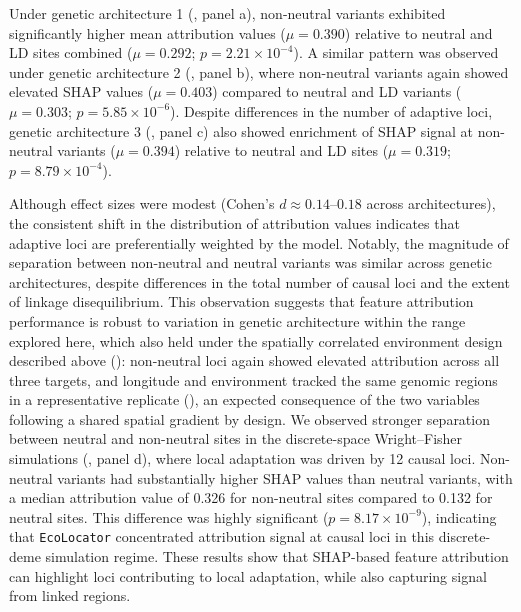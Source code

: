 \documentclass[]{article}
\newcommand{\ecolocator}{\texttt{EcoLocator}\xspace}
\begin{document}
Under genetic architecture 1
(, panel a),
non-neutral variants exhibited significantly higher mean attribution values
($\mu = 0.390$) relative to neutral and LD sites combined
($\mu = 0.292$; $p = 2.21 \times 10^{-4}$).
A similar pattern was observed under genetic architecture 2
(, panel b),
where non-neutral variants again showed elevated SHAP values
($\mu = 0.403$)
compared to neutral and LD variants
($\mu = 0.303$; $p = 5.85 \times 10^{-6}$).
Despite differences in the number of adaptive loci,
genetic architecture 3
(, panel c)
also showed enrichment of SHAP signal at non-neutral variants
($\mu = 0.394$)
relative to neutral and LD sites
($\mu = 0.319$; $p = 8.79 \times 10^{-4}$).

Although effect sizes were modest
(Cohen's $d \approx 0.14$--$0.18$ across architectures),
the consistent shift in the distribution of attribution values
indicates that adaptive loci are preferentially weighted by the model.
Notably,
the magnitude of separation between non-neutral and neutral variants
was similar across genetic architectures,
despite differences in the total number of causal loci
and the extent of linkage disequilibrium.
This observation suggests that feature attribution performance is robust 
to variation in genetic architecture within the range explored here, 
which also held under the spatially correlated environment design 
described above (): non-neutral loci again showed 
elevated attribution across all three targets, and longitude and 
environment tracked the same genomic regions in a representative 
replicate (), an expected consequence of the two 
variables following a shared spatial gradient by design.
We observed stronger separation between neutral and non-neutral sites
in the discrete-space Wright--Fisher simulations
(, panel d),
where local adaptation was driven by 12 causal loci.
Non-neutral variants had substantially higher SHAP values
than neutral variants,
with a median attribution value of 0.326
for non-neutral sites compared to 0.132
for neutral sites.
This difference was highly significant
($p = 8.17 \times 10^{-9}$),
indicating that \ecolocator concentrated attribution signal
at causal loci in this discrete-deme simulation regime.
These results show that SHAP-based feature attribution
can highlight loci contributing to local adaptation,
while also capturing signal from linked regions.
\end{document}
